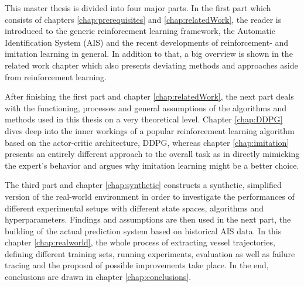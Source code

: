 This master thesis is divided into four major parts. In the first part which consists of chapters \ref{chap:prerequisites} and \ref{chap:relatedWork}, the reader is introduced to the generic reinforcement learning framework, the Automatic Identification System (AIS) and the recent developments of reinforcement- and imitation learning in general. In addition to that, a big overview is shown in the related work chapter which also presents deviating methods and approaches aside from reinforcement learning.
\par
After finishing the first part and chapter \ref{chap:relatedWork}, the next part deals with the functioning, processes and general assumptions of the algorithms and methods used in this thesis on a very theoretical level. Chapter \ref{chap:DDPG} dives deep into the inner workings of a popular reinforcement learning algorithm based on the actor-critic architecture, DDPG, whereas chapter \ref{chap:imitation} presents an entirely different approach to the overall task as in directly mimicking the expert's behavior and argues why imitation learning might be a better choice.
\par
The third part and chapter \ref{chap:synthetic} constructs a synthetic, simplified version of the real-world environment in order to investigate the performances of different experimental setups with different state spaces, algorithms and hyperparameters. Findings and assumptions are then used in the next part, the building of the actual prediction system based on historical AIS data. In this chapter \ref{chap:realworld}, the whole process of extracting vessel trajectories, defining different training sets, running experiments, evaluation as well as failure tracing and the proposal of possible improvements take place. In the end, conclusions are drawn in chapter \ref{chap:conclusions}.